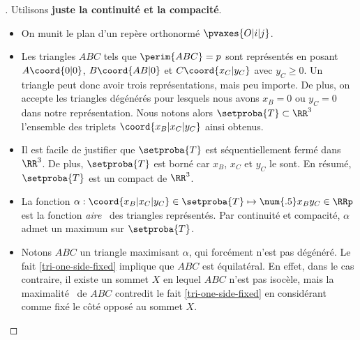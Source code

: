 

\begin{proof}[] \label{tri-topo-comp}
	Utilisons \textbf{juste la continuité et la compacité}.%
	\begin{itemize}
		\item On munit le plan d'un repère orthonormé $\pvaxes{O | i | j}$. 

		\item Les triangles $ABC$ tels que $\perim{ABC} = p$ sont représentés en posant $A\coord{0 | 0}$, $B\coord{AB | 0}$ et $C\coord{x_C | y_C}$ avec $y_C \geq 0$. Un triangle peut donc avoir trois représentations, mais peu importe.
		De plus, on accepte les triangles dégénérés pour lesquels nous avons $x_B = 0$ ou $y_C = 0$ dans notre représentation.
		Nous notons alors $\setproba{T} \subset \RR^3$ l'ensemble des triplets $\coord{x_B | x_C | y_C}$ ainsi obtenus.

		\item Il est facile de justifier que $\setproba{T}$ est séquentiellement fermé dans $\RR^3$.
		De plus, $\setproba{T}$ est borné car $x_B$, $x_C$ et $y_C$ le sont.
		En résumé, $\setproba{T}$ est un compact de $\RR^3$.

		\item La fonction $\alpha: \coord{x_B | x_C | y_C} \in \setproba{T} \mapsto \num{.5} x_B y_C \in \RRp$ est la fonction \og \emph{aire} \fg\ des triangles représentés.
		Par continuité et compacité, $\alpha$ admet un maximum sur $\setproba{T}$. 
		

		\item Notons $ABC$ un triangle maximisant $\alpha$, qui forcément n'est pas dégénéré. 
		Le fait \ref{tri-one-side-fixed} implique que $ABC$ est équilatéral. 
		En effet,
		dans le cas contraire, il existe un sommet $X$ en lequel $ABC$ n'est pas isocèle, mais la \og maximalité \fg\ de $ABC$ contredit le fait \ref{tri-one-side-fixed} en considérant comme fixé le côté opposé au sommet $X$.
	\end{itemize}
	
	\null\vspace{-6ex}
\end{proof}




